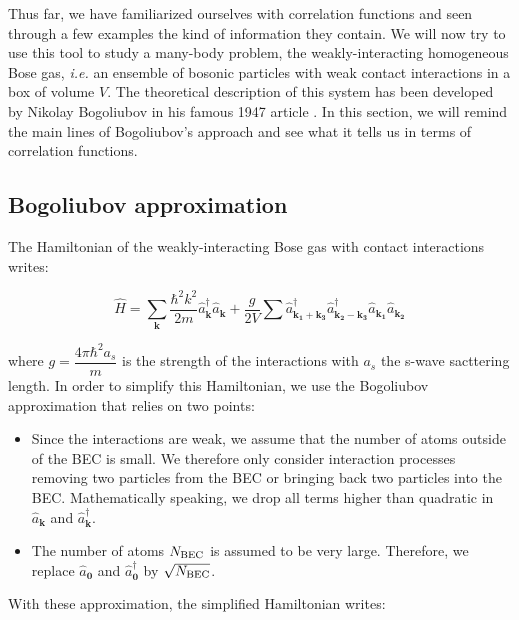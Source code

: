 Thus far, we have familiarized ourselves with correlation functions and seen through a few examples the kind of information they contain. We will now try to use this tool to study a many-body problem, the weakly-interacting homogeneous Bose gas, {\it i.e.} an ensemble of bosonic particles with weak contact interactions in a box of volume $V$. The theoretical description of this system has been developed by Nikolay Bogoliubov in his famous 1947 article \cite{bogoliubov1947}. In this section, we will remind the main lines of Bogoliubov's approach and see what it tells us in terms of correlation functions.

\subsection{Bogoliubov approximation}


The Hamiltonian of the weakly-interacting Bose gas with contact interactions writes:

\begin{equation}
    \hat{H}=\sum_{\bm{k}}\frac{\hbar^2 k^2}{2m} \hat{a}^{\dagger}_{\bm{k}}  \hat{a}_{\bm{k}} +  \frac{g}{2V} \sum \hat{a}^{\dagger}_{\bm{k_1}+\bm{k_3}} \hat{a}^{\dagger}_{\bm{k_2}-\bm{k_3}} \hat{a}_{\bm{k_1}} \hat{a}_{\bm{k_2}} 
\end{equation}

\noindent where $g=\dfrac{4 \pi \hbar^2 a_s}{m}$ is the strength of the interactions with $a_s$ the s-wave sacttering length.  In order to simplify this Hamiltonian, we use the Bogoliubov approximation that relies on two points:

\begin{itemize}
    \item Since the interactions are weak, we assume that the number of atoms outside of the BEC is small. We therefore only consider interaction processes removing two particles from the BEC or bringing back two particles into the BEC. Mathematically speaking, we drop all terms higher than quadratic in $\hat{a}_{\bm{k}}$ and $\hat{a}^{\dagger}_{\bm{k}}$.
    \item The number of atoms $N_{\rm{BEC}}$ is assumed to be very large. Therefore, we replace $\hat{a}_{\bm{0}}$ and $\hat{a}^{\dagger}_{\bm{0}}$ by $\sqrt{N_{\rm{BEC}}}$. 
\end{itemize}

With these approximation, the simplified Hamiltonian writes:

